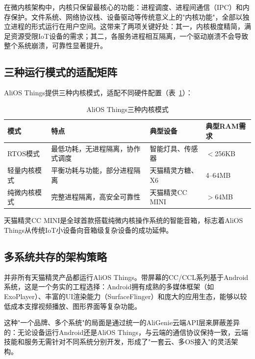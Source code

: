 \documentclass[12pt, a4paper, twoside, openright]{book}
\begin{document}
在微内核架构中，内核只保留最核心的功能：进程调度、进程间通信（IPC）和内存保护。文件系统、网络协议栈、设备驱动等传统意义上的"内核功能"，全部以独立进程的形式运行在用户空间。这带来了两项关键好处：其一，内核极度精简，满足资源受限IoT设备的需求；其二，各服务进程相互隔离，一个驱动崩溃不会导致整个系统崩溃，可靠性显著提升。

\subsection{三种运行模式的适配矩阵}

AliOS Things提供三种内核模式，适配不同硬件配置（表~\ref{tab:alios-modes}）：

\begin{table}[H]
\centering
\caption{AliOS Things三种内核模式}
\label{tab:alios-modes}
\begin{tabularx}{\linewidth}{l X X l}
\toprule
\textbf{模式} & \textbf{特点} & \textbf{典型设备} & \textbf{典型RAM需求} \\
\midrule
RTOS模式     & 最低功耗，无进程隔离，协作式调度      & 智能灯具、传感器      & $<$256KB \\
轻量内核模式 & 平衡功耗与功能，部分进程隔离          & 天猫精灵方糖、X6      & 4--64MB \\
纯微内核模式 & 完整进程隔离，高安全可靠性            & 天猫精灵CC MINI       & $>$64MB \\
\bottomrule
\end{tabularx}
\end{table}

天猫精灵CC MINI是全球首款搭载纯微内核操作系统的智能音箱，标志着AliOS Things从传统IoT小设备向音箱级复杂设备的成功延伸。

\subsection{多系统共存的架构策略}

并非所有天猫精灵产品都运行AliOS Things。带屏幕的CC/CCL系列基于Android系统，这是一个务实的工程选择：Android拥有成熟的多媒体框架（如ExoPlayer）、丰富的UI渲染能力（SurfaceFlinger）和庞大的应用生态，能够以较低成本支撑视频播放、图形界面等复杂功能。

这种"一个品牌、多个系统"的局面是通过统一的AliGenie云端API层来屏蔽差异的：无论设备运行Android还是AliOS Things，与云端的通信协议保持一致，云端技能和服务无需针对不同系统分别开发，形成了"一套云、多OS接入"的灵活架构。

\end{document}
